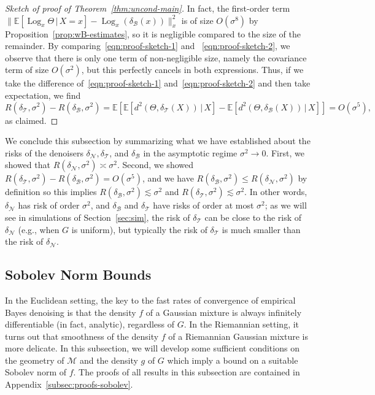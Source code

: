 \documentclass[preprint]{imsart}
\theoremstyle{plain}
\theoremstyle{definition}
\newcommand{\Ebb}{\mathbb{E}}
\newcommand{\Mcal}{\mathcal{M}}
\newcommand{\B}{\mathcal{B}}
\newcommand{\N}{\mathcal{N}}
\newcommand{\T}{\mathcal{T}}
\DeclareMathOperator{\Log}{Log}
\begin{document}
\begin{proof}[Sketch of proof of Theorem~\ref{thm:uncond-main}]
    In fact, the first-order term $\|\Ebb[\Log_x\Theta\,|\,X=x]-\Log_x(\delta_{\B}(x)) \|_x^2$ is of size $O(\sigma^8)$ by Proposition~\ref{prop:wB-estimates}, so it is negligible compared to the size of the remainder.
    By comparing~\eqref{eqn:proof-sketch-1} and ~\eqref{eqn:proof-sketch-2}, we observe that there is only one term of non-negligible size, namely the covariance term  of size $O(\sigma^2)$, but this perfectly cancels in both expressions.
    Thus, if we take the difference of~\eqref{eqn:proof-sketch-1} and~\eqref{eqn:proof-sketch-2} and then take expectation, we find
    \begin{equation*}
        R(\delta_{\T},\sigma^2) - R(\delta_{\B},\sigma^2) = \Ebb[\Ebb[d^2(\Theta,\delta_{\T}(X))\,|\,X] - \Ebb[d^2(\Theta,\delta_{\B}(X))\,|\,X]] = O(\sigma^5),
    \end{equation*}
    as claimed.
\end{proof}

We conclude this subsection by summarizing what we have established about the risks of the denoisers $\delta_{\N},\delta_{\T}$, and $\delta_{\B}$ in the asymptotic regime $\sigma^2\to 0$.
First, we showed that $R(\delta_{\N},\sigma^2) \asymp \sigma^2$.
Second, we showed $R(\delta_{\T},\sigma^2) -R(\delta_{\B},\sigma^2) = O(\sigma^5)$, and we have $R(\delta_{\B},\sigma^2)\le R(\delta_{\N},\sigma^2)$ by definition so this implies $R(\delta_{\B},\sigma^2) \lesssim \sigma^2$ and $R(\delta_{\T},\sigma^2) \lesssim \sigma^2$.
In other words, $\delta_{\N}$ has risk of order $\sigma^2$, and $\delta_{\B}$ and $\delta_{\T}$ have risks of order at most $\sigma^2$; as we will see in simulations of Section~\ref{sec:sim}, the risk of $\delta_{\T}$ can be close to the risk of $\delta_{\N}$ (e.g., when $G$ is uniform), but typically the risk of $\delta_{\T}$ is much smaller than the risk of $\delta_{\N}$. 

\fi

\subsection{Sobolev Norm Bounds}\label{subsec:sobolev}

In the Euclidean setting, the key to the fast rates of convergence of empirical Bayes denoising is that the density $f$ of a Gaussian mixture is always infinitely differentiable (in fact, analytic), regardless of $G$.
In the Riemannian setting, it turns out that smoothness of the density $f$ of a Riemannian Gaussian mixture is more delicate. In this subsection, we will develop some sufficient conditions on the geometry of $\Mcal$ and the density $g$ of $G$ which imply a bound on a suitable Sobolev norm of $f$.
The proofs of all results in this subsection are contained in Appendix~\ref{subsec:proofs-sobolev}.
\end{document}
